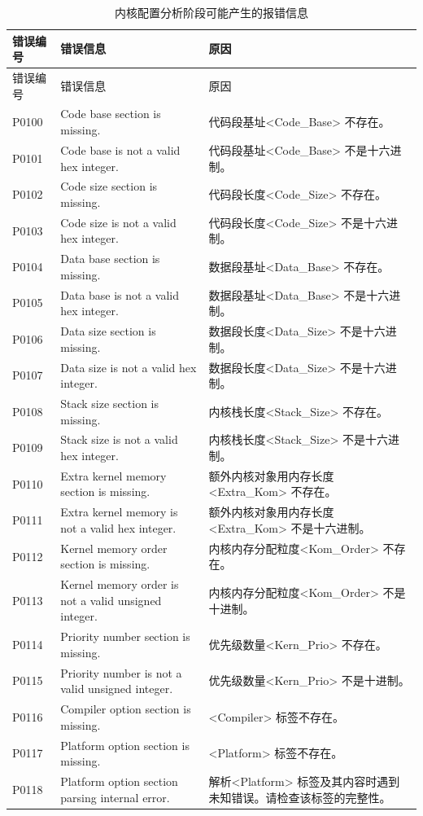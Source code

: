 \begin{xltabular}{\textwidth}{@{}>{\hsize\raggedright\arraybackslash}X>{\hsize\raggedright\arraybackslash}X>{\hsize\raggedright\arraybackslash}X@{}}
\caption{内核配置分析阶段可能产生的报错信息}\label{tab:5-4}\\
\toprule
错误编号 & 错误信息 & 原因\tabularnewline
\endfirsthead
\toprule
错误编号 & 错误信息 & 原因\tabularnewline
\midrule
\endhead
\bottomrule
\endlastfoot
P0100 & Code base section is missing. &
代码段基址<Code\_\allowbreak{}Base> 不存在。\tabularnewline
P0101 & Code base is not a valid hex integer. &
代码段基址<Code\_\allowbreak{}Base> 不是十六进制。\tabularnewline
P0102 & Code size section is missing. &
代码段长度<Code\_\allowbreak{}Size> 不存在。\tabularnewline
P0103 & Code size is not a valid hex integer. &
代码段长度<Code\_\allowbreak{}Size> 不是十六进制。\tabularnewline
P0104 & Data base section is missing. &
数据段基址<Data\_\allowbreak{}Base> 不存在。\tabularnewline
P0105 & Data base is not a valid hex integer. &
数据段基址<Data\_\allowbreak{}Base> 不是十六进制。\tabularnewline
P0106 & Data size section is missing. &
数据段长度<Data\_\allowbreak{}Size> 不是十六进制。\tabularnewline
P0107 & Data size is not a valid hex integer. &
数据段长度<Data\_\allowbreak{}Size> 不是十六进制。\tabularnewline
P0108 & Stack size section is missing. &
内核栈长度<Stack\_\allowbreak{}Size> 不存在。\tabularnewline
P0109 & Stack size is not a valid hex integer. &
内核栈长度<Stack\_\allowbreak{}Size> 不是十六进制。\tabularnewline
P0110 & Extra kernel memory section is missing. &
额外内核对象用内存长度<Extra\_\allowbreak{}Kom> 不存在。\tabularnewline
P0111 & Extra kernel memory is not a valid hex integer. &
额外内核对象用内存长度<Extra\_\allowbreak{}Kom> 不是十六进制。\tabularnewline
P0112 & Kernel memory order section is missing. &
内核内存分配粒度<Kom\_\allowbreak{}Order> 不存在。\tabularnewline
P0113 & Kernel memory order is not a valid unsigned integer. &
内核内存分配粒度<Kom\_\allowbreak{}Order> 不是十进制。\tabularnewline
P0114 & Priority number section is missing. &
优先级数量<Kern\_\allowbreak{}Prio> 不存在。\tabularnewline
P0115 & Priority number is not a valid unsigned integer. &
优先级数量<Kern\_\allowbreak{}Prio> 不是十进制。\tabularnewline
P0116 & Compiler option section is missing. &
<Compiler> 标签不存在。\tabularnewline
P0117 & Platform option section is missing. &
<Platform> 标签不存在。\tabularnewline
P0118 & Platform option section parsing internal error. &
解析<Platform> 标签及其内容时遇到未知错误。请检查该标签的完整性。\tabularnewline

\end{xltabular}
